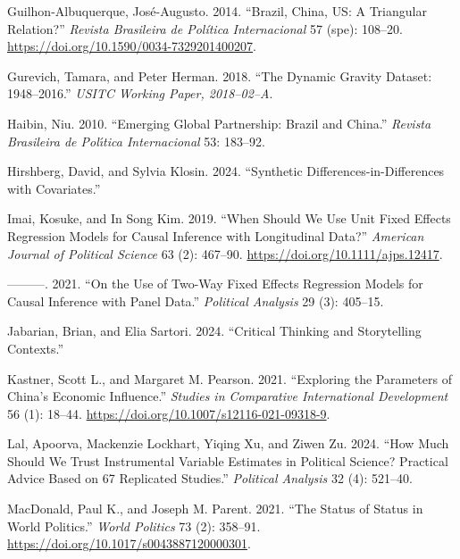 \documentclass[
  12pt,
]{article}
\newlength{\cslhangindent}
\newenvironment{CSLReferences}[2] %
 {\begin{list}{}{%
  \setlength{\itemindent}{0pt}
  \setlength{\leftmargin}{0pt}
  \setlength{\parsep}{0pt}
  \ifodd #1
   \setlength{\leftmargin}{\cslhangindent}
   \setlength{\itemindent}{-1\cslhangindent}
  \fi
  \setlength{\itemsep}{#2\baselineskip}}}
 {\end{list}}
\begin{document}
\begin{CSLReferences}{1}{0}
Guilhon-Albuquerque, José-Augusto. 2014. {``Brazil, {China}, {US}: A
Triangular Relation?''} \emph{Revista Brasileira de Pol{í}tica
Internacional} 57 (spe): 108--20.
\url{https://doi.org/10.1590/0034-7329201400207}.

Gurevich, Tamara, and Peter Herman. 2018. {``The Dynamic Gravity
Dataset: 1948--2016.''} \emph{USITC Working Paper, 2018--02--A}.

Haibin, Niu. 2010. {``Emerging Global Partnership: {Brazil} and
China.''} \emph{Revista Brasileira de Pol{ı́}tica Internacional} 53:
183--92.

Hirshberg, David, and Sylvia Klosin. 2024. {``Synthetic
Differences-in-Differences with Covariates.''}

Imai, Kosuke, and In Song Kim. 2019. {``When {Should We Use Unit Fixed
Effects Regression Models} for {Causal Inference} with {Longitudinal
Data}?''} \emph{American Journal of Political Science} 63 (2): 467--90.
\url{https://doi.org/10.1111/ajps.12417}.

---------. 2021. {``On the Use of Two-Way Fixed Effects Regression
Models for Causal Inference with Panel Data.''} \emph{Political
Analysis} 29 (3): 405--15.

Jabarian, Brian, and Elia Sartori. 2024. {``Critical Thinking and
Storytelling Contexts.''}

Kastner, Scott L., and Margaret M. Pearson. 2021. {``Exploring the
{Parameters} of {China}'s {Economic Influence}.''} \emph{Studies in
Comparative International Development} 56 (1): 18--44.
\url{https://doi.org/10.1007/s12116-021-09318-9}.

Lal, Apoorva, Mackenzie Lockhart, Yiqing Xu, and Ziwen Zu. 2024. {``How
Much Should We Trust Instrumental Variable Estimates in Political
Science? {Practical} Advice Based on 67 Replicated Studies.''}
\emph{Political Analysis} 32 (4): 521--40.

MacDonald, Paul K., and Joseph M. Parent. 2021. {``The {Status} of
{Status} in {World Politics}.''} \emph{World Politics} 73 (2): 358--91.
\url{https://doi.org/10.1017/s0043887120000301}.


\end{CSLReferences}
\end{document}
